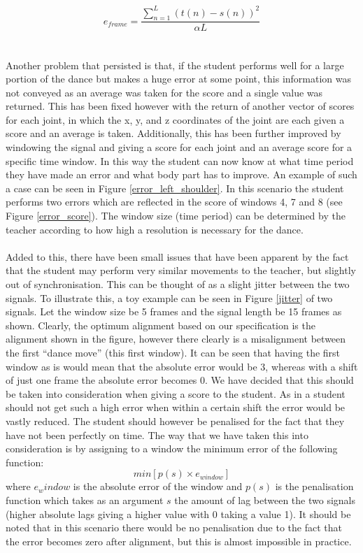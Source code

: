 \documentclass[a4paper]{article}
\begin{document}
\begin{equation}
e_{frame} = \dfrac{\sum\limits_{n=1}^{L}(t(n)-s(n))^2}{\alpha L}
\label{error_eq}
\end{equation}
\\\\
\noindent
Another problem that persisted is that, if the student performs well for a large portion of the dance but makes a huge error at some point, this information was not conveyed as an average was taken for the score and a single value was returned. This has been fixed however with the return of another vector of scores for each joint, in which the x, y, and z coordinates of the joint are each given a score and an average is taken. Additionally, this has been further improved by windowing the signal and giving a score for each joint and an average score for a specific time window. In this way the student can now know at what time period they have made an error and what body part has to improve. An example of such a case can be seen in Figure \ref{error_left_shoulder}. In this scenario the student performs two errors which are reflected in the score of windows 4, 7 and 8 (see Figure \ref{error_score}). The window size (time period) can be determined by the teacher according to how high a resolution is necessary for the dance.
\\\\
\noindent
Added to this, there have been small issues that have been apparent by the fact that the student may perform very similar movements to the teacher, but slightly out of synchronisation. This can be thought of as a slight jitter between the two signals. To illustrate this, a toy example can be seen in Figure \ref{jitter} of two signals. Let the window size be 5 frames and the signal length be 15 frames as shown. Clearly, the optimum alignment based on our specification is the alignment shown in the figure, however there clearly is a misalignment between the first ``dance move'' (this first window). It can be seen that having the first window as is would mean that the absolute error would be 3, whereas with a shift of just one frame the absolute error becomes 0. We have decided that this should be taken into consideration when giving a score to the student. As in a student should not get such a high error when within a certain shift the error would be vastly reduced. The student should however be penalised for the fact that they have not been perfectly on time. The way that we have taken this into consideration is by assigning to a window the minimum error of the following function:
\begin{equation}
min\left[p(s) \times e_{window}\right]
\end{equation}
where $e_window$ is the absolute error of the window and $p(s)$ is the penalisation function which takes as an argument $s$ the amount of lag between the two signals (higher absolute lags giving a higher value with 0 taking a value 1). It should be noted that in this scenario there would be no penalisation due to the fact that the error becomes zero after alignment, but this is almost impossible in practice. 
\end{document}
